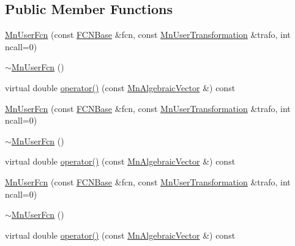 \subsection*{Public Member Functions}
\begin{DoxyCompactItemize}
\item 
\mbox{\hyperlink{classROOT_1_1Minuit2_1_1MnUserFcn_aec0ec51bd2b1e3b88f686f802f2c277f}{Mn\+User\+Fcn}} (const \mbox{\hyperlink{classROOT_1_1Minuit2_1_1FCNBase}{F\+C\+N\+Base}} \&fcn, const \mbox{\hyperlink{classROOT_1_1Minuit2_1_1MnUserTransformation}{Mn\+User\+Transformation}} \&trafo, int ncall=0)
\item 
\mbox{\hyperlink{classROOT_1_1Minuit2_1_1MnUserFcn_afa175648109f4cec5ab7dd274d0b0e75}{$\sim$\+Mn\+User\+Fcn}} ()
\item 
virtual double \mbox{\hyperlink{classROOT_1_1Minuit2_1_1MnUserFcn_a7f25ae05f1caca57bd8d1e83b9643dfe}{operator()}} (const \mbox{\hyperlink{namespaceROOT_1_1Minuit2_a62ed97730a1ca8d3fbaec64a19aa11c9}{Mn\+Algebraic\+Vector}} \&) const
\item 
\mbox{\hyperlink{classROOT_1_1Minuit2_1_1MnUserFcn_aec0ec51bd2b1e3b88f686f802f2c277f}{Mn\+User\+Fcn}} (const \mbox{\hyperlink{classROOT_1_1Minuit2_1_1FCNBase}{F\+C\+N\+Base}} \&fcn, const \mbox{\hyperlink{classROOT_1_1Minuit2_1_1MnUserTransformation}{Mn\+User\+Transformation}} \&trafo, int ncall=0)
\item 
\mbox{\hyperlink{classROOT_1_1Minuit2_1_1MnUserFcn_afa175648109f4cec5ab7dd274d0b0e75}{$\sim$\+Mn\+User\+Fcn}} ()
\item 
virtual double \mbox{\hyperlink{classROOT_1_1Minuit2_1_1MnUserFcn_aad007634c740a70ebb8f5acb0a7cfede}{operator()}} (const \mbox{\hyperlink{namespaceROOT_1_1Minuit2_a62ed97730a1ca8d3fbaec64a19aa11c9}{Mn\+Algebraic\+Vector}} \&) const
\item 
\mbox{\hyperlink{classROOT_1_1Minuit2_1_1MnUserFcn_aec0ec51bd2b1e3b88f686f802f2c277f}{Mn\+User\+Fcn}} (const \mbox{\hyperlink{classROOT_1_1Minuit2_1_1FCNBase}{F\+C\+N\+Base}} \&fcn, const \mbox{\hyperlink{classROOT_1_1Minuit2_1_1MnUserTransformation}{Mn\+User\+Transformation}} \&trafo, int ncall=0)
\item 
\mbox{\hyperlink{classROOT_1_1Minuit2_1_1MnUserFcn_afa175648109f4cec5ab7dd274d0b0e75}{$\sim$\+Mn\+User\+Fcn}} ()
\item 
virtual double \mbox{\hyperlink{classROOT_1_1Minuit2_1_1MnUserFcn_aad007634c740a70ebb8f5acb0a7cfede}{operator()}} (const \mbox{\hyperlink{namespaceROOT_1_1Minuit2_a62ed97730a1ca8d3fbaec64a19aa11c9}{Mn\+Algebraic\+Vector}} \&) const
\end{DoxyCompactItemize}
